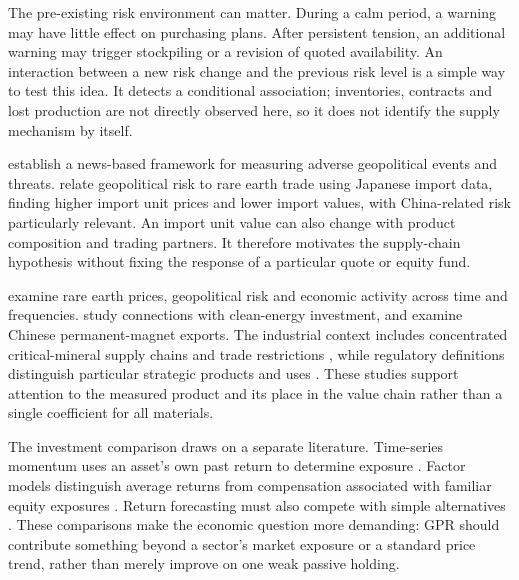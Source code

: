 The pre-existing risk environment can matter. During a calm period, a warning may have little effect on purchasing plans. After persistent tension, an additional warning may trigger stockpiling or a revision of quoted availability. An interaction between a new risk change and the previous risk level is a simple way to test this idea. It detects a conditional association; inventories, contracts and lost production are not directly observed here, so it does not identify the supply mechanism by itself.

\citet{caldara2022} establish a news-based framework for measuring adverse geopolitical events and threats. \citet{fan2023} relate geopolitical risk to rare earth trade using Japanese import data, finding higher import unit prices and lower import values, with China-related risk particularly relevant. An import unit value can also change with product composition and trading partners. It therefore motivates the supply-chain hypothesis without fixing the response of a particular quote or equity fund.

\citet{li2023} examine rare earth prices, geopolitical risk and economic activity across time and frequencies. \citet{depraiter2025} study connections with clean-energy investment, and \citet{magnets2025} examine Chinese permanent-magnet exports. The industrial context includes concentrated critical-mineral supply chains and trade restrictions \citep{iea2025}, while regulatory definitions distinguish particular strategic products and uses \citep{eu2024}. These studies support attention to the measured product and its place in the value chain rather than a single coefficient for all materials.

The investment comparison draws on a separate literature. Time-series momentum uses an asset's own past return to determine exposure \citep{moskowitz2012}. Factor models distinguish average returns from compensation associated with familiar equity exposures \citep{fama2015}. Return forecasting must also compete with simple alternatives \citep{campbell2008}. These comparisons make the economic question more demanding: GPR should contribute something beyond a sector's market exposure or a standard price trend, rather than merely improve on one weak passive holding.
